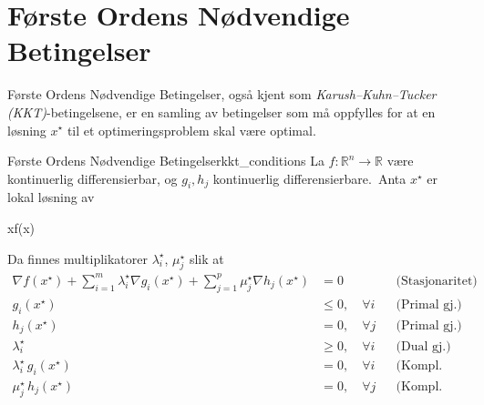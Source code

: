 \begin{center}
\end{center}

\section{Første Ordens Nødvendige Betingelser}
\label{sec:optimality_conditions}
Første Ordens Nødvendige Betingelser, også kjent som \emph{Karush--Kuhn--Tucker (KKT)}-betingelsene, er en samling av betingelser som må oppfylles for at en løsning \(x^\star\) til et optimeringsproblem skal være optimal.

\begin{theorem}{Første Ordens Nødvendige Betingelser}{kkt_conditions}
	La \(f: \mathbb{R}^n \to \mathbb{R}\) være kontinuerlig differensierbar, og
	\(g_i, h_j\) kontinuerlig differensierbare.\
	Anta \(x^\star\) er lokal løsning av
	\begin{mini*}
		{x}{f(x)}{}{}
	\end{mini*}
	Da finnes multiplikatorer \(\lambda_i^\star\), \(\mu_j^\star\) slik at
	\begin{align}
		\nabla f(x^\star)
		+ \sum_{i=1}^m \lambda_i^\star\nabla g_i(x^\star)
		+ \sum_{j=1}^p \mu_j^\star\nabla h_j(x^\star)
		                              & = 0                   &  & \text{(Stasjonaritet)}   \\
		g_i(x^\star)                  & \le 0,\quad \forall i &  & \text{(Primal gj.)}      \\
		h_j(x^\star)                  & = 0,\quad \forall j   &  & \text{(Primal gj.)}      \\
		\lambda_i^\star               & \ge 0,\quad \forall i &  & \text{(Dual gj.)}        \\
		\lambda_i^\star\,g_i(x^\star) & =0,\quad \forall i    &  & \text{(Kompl. slakkhet)} \\
		\mu_j^\star\,h_j(x^\star)     & =0,\quad \forall j    &  & \text{(Kompl. slakkhet)}
	\end{align}
\end{theorem}

